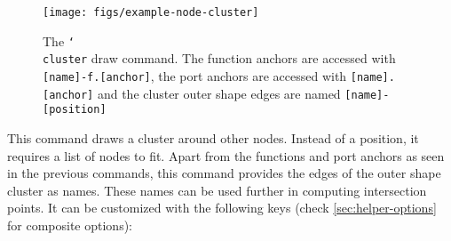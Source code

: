 \documentclass[10pt]{article}
\newcommand\bookmark[1]{\marginpar{\ttfamily #1}}
\def\opt#1{\color{gray}{#1}}
\def\man#1{\color{black}{#1}}
\begin{document}
\begin{figure}[htb]\centering
\texttt{[image: figs/example-node-cluster]}

\caption{The \texttt{\char`\\cluster} draw command. The function anchors are accessed with \texttt{[name]-f.[anchor]}, the port anchors are accessed with \texttt{[name].[anchor]} and the cluster outer shape edges are named \texttt{[name]-[position]}}
\end{figure}
\hspace{1pt}\bookmark{\char`\\cluster\opt{[options]}\opt{(name)}\man{<list~of~clustered~nodes>}\man{\{label\}};}

\noindent This command draws a cluster around other nodes. Instead of a position, it requires a list of nodes to fit. Apart from the functions and port anchors as seen in the previous commands, this command provides the edges of the outer shape cluster as names. These names can be used further in computing intersection points. It can be customized with the following keys (check \ref{sec:helper-options} for composite options):
\end{document}
